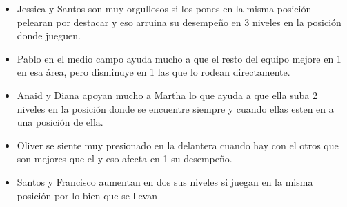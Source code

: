 \documentclass[10pt,letterpaper,twoside,openright]{article}
\begin{document}
	\begin{itemize}
		\item Jessica y Santos son muy orgullosos si los pones en la misma posición pelearan por destacar y eso arruina su desempeño en 3 niveles en la posición donde jueguen.
		\item Pablo en el medio campo ayuda mucho a que el resto del equipo mejore en 1 en esa área, pero disminuye en 1 las que lo rodean directamente.
		\item Anaid y Diana apoyan mucho a Martha lo que ayuda a que ella suba 2 niveles en la posición donde se encuentre siempre y cuando ellas esten en a una posición de ella.
		\item Oliver se siente muy presionado en la delantera cuando hay con el otros que son mejores que el y eso afecta en 1 su desempeño.
		\item Santos y Francisco aumentan en dos sus niveles si juegan en la misma posición por lo bien que se llevan 
	\end{itemize}
		
\end{document}
